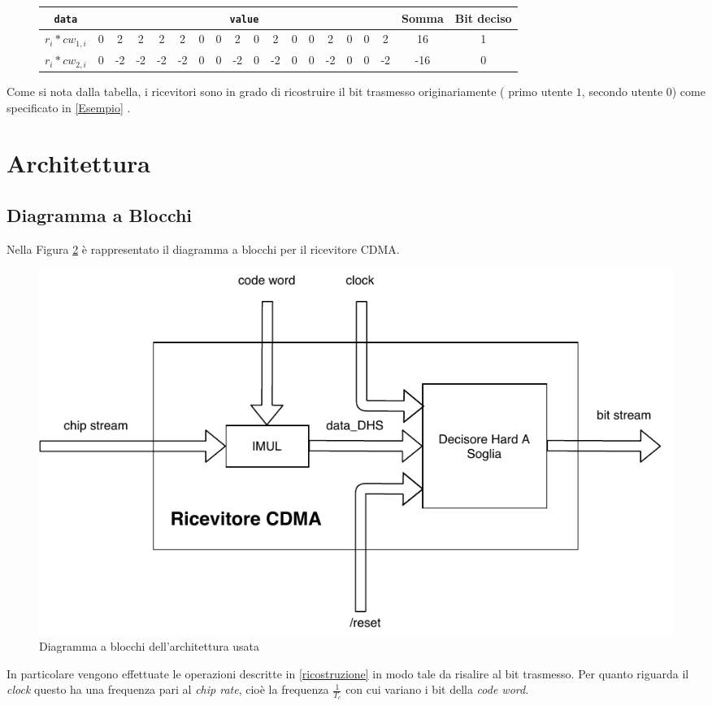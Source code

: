 \documentclass[a4paper,12pt]{article}
\begin{document}
    \begin{figure}[H]
      \centering
      \begin{tabular}{| c | c | c | c | c | c | c | c | c | c | c | c | c | c | c | c | c | c | c |}\hline
        \texttt{data} & \multicolumn{16}{|c|}{\texttt{value}} & Somma & Bit deciso\\ \hline
        $r_i * cw_{1,i}$ &0&2&2&2&2&0&0&2&0&2&0&0&2&0&0&2&16&1 \\ \hline
        $r_i * cw_{2,i}$ &0&-2&-2&-2&-2&0&0&-2&0&-2&0&0&-2&0&0&-2&-16&0 \\ \hline
      \end{tabular}
      \label{tab:Decisore}
    \end{figure}

    Come si nota dalla tabella, i ricevitori sono in grado di ricostruire il bit trasmesso originariamente ( primo utente
     $1$, secondo utente $0$) come specificato in \ref{Esempio} .

\section{Architettura}
  \subsection{Diagramma a Blocchi}
    Nella Figura \ref{fig:Architettura} è rappresentato il diagramma a blocchi per il ricevitore CDMA.
      \begin{figure}[H]
      \centering
      \includegraphics[scale=0.75]{img/Architettura.pdf}
      \caption{ Diagramma a blocchi dell'architettura usata }
      \label{fig:Architettura}
    \end{figure}
    In particolare vengono effettuate le operazioni descritte in \ref{ricostruzione} in modo tale da risalire al bit 
    trasmesso. Per quanto riguarda il \textit{clock} questo ha una frequenza pari al \textit{chip rate}, cioè la frequenza
    $\frac{1}{T_c}$ con cui variano i bit della \textit{code word}.
\end{document}
